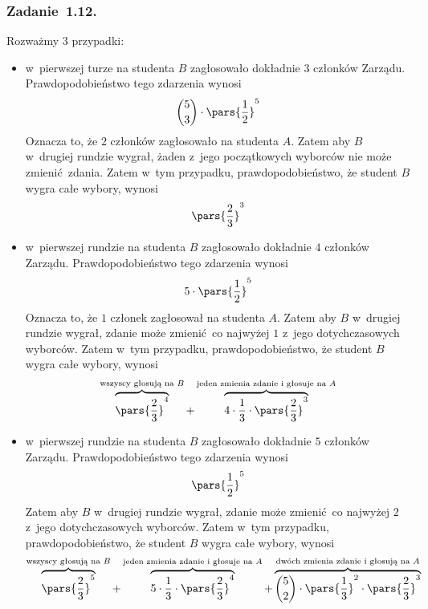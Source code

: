 \subsubsection*{Zadanie~1.12.}
Rozważmy \(3\) przypadki:
\begin{itemize}
    \item w~pierwszej turze na studenta \(B\) zagłosowało dokładnie \(3\) członków Zarządu. Prawdopodobieństwo tego zdarzenia wynosi
        \begin{equation*}
            \binom{5}{3} \cdot \pars{\frac{1}{2}}^5
        \end{equation*}
        Oznacza to, że \(2\) członków zagłosowało na studenta \(A\). Zatem aby \(B\) w~drugiej rundzie wygrał, żaden z~jego początkowych wyborców nie może zmienić zdania. Zatem w~tym przypadku, prawdopodobieństwo, że student \(B\) wygra całe wybory, wynosi
        \begin{equation*}
            \pars{\frac{2}{3}}^3
        \end{equation*}
    \item w~pierwszej rundzie na studenta \(B\) zagłosowało dokładnie \(4\) członków Zarządu. Prawdopodobieństwo tego zdarzenia wynosi
        \begin{equation*}
            5 \cdot \pars{\frac{1}{2}}^5
        \end{equation*}
        Oznacza to, że \(1\) członek zagłosował na studenta \(A\). Zatem aby \(B\) w~drugiej rundzie wygrał, zdanie może zmienić co najwyżej \(1\) z~jego dotychczasowych wyborców. Zatem w~tym przypadku, prawdopodobieństwo, że student \(B\) wygra całe wybory, wynosi
        \begin{equation*}
            \overbrace{\pars{\frac{2}{3}}^4}^{\text{wszyscy głosują na \(B\)}} + \overbrace{4 \cdot \frac{1}{3} \cdot \pars{\frac{2}{3}}^3}^{\text{jeden zmienia zdanie i~głosuje na \(A\)}}
        \end{equation*}
    \item w~pierwszej rundzie na studenta \(B\) zagłosowało dokładnie \(5\) członków Zarządu. Prawdopodobieństwo tego zdarzenia wynosi
        \begin{equation*}
            \pars{\frac{1}{2}}^5
        \end{equation*}
        Zatem aby \(B\) w~drugiej rundzie wygrał, zdanie może zmienić co najwyżej \(2\) z~jego dotychczasowych wyborców. Zatem w~tym przypadku, prawdopodobieństwo, że student \(B\) wygra całe wybory, wynosi
        \begin{equation*}
            \overbrace{\pars{\frac{2}{3}}^5}^{\text{wszyscy głosują na \(B\)}} + \overbrace{5 \cdot \frac{1}{3} \cdot \pars{\frac{2}{3}}^4}^{\text{jeden zmienia zdanie i~głosuje na \(A\)}} + \overbrace{\binom{5}{2} \cdot \pars{\frac{1}{3}}^2 \cdot \pars{\frac{2}{3}}^3}^{\text{dwóch zmienia zdanie i~głosują na \(A\)}}
        \end{equation*}
\end{itemize}
